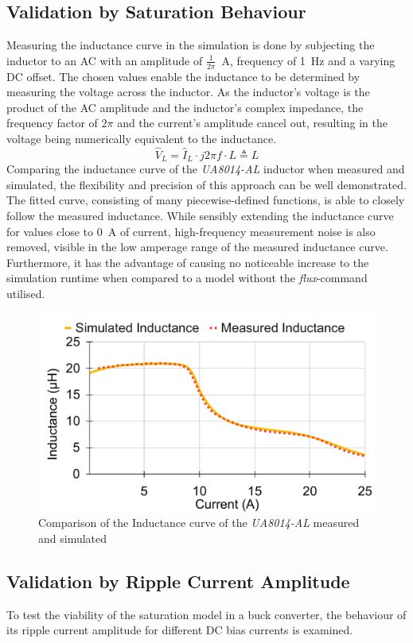 \subsection{Validation by Saturation Behaviour}\label{sec:validation_by_saturation}
Measuring the inductance curve in the simulation is done by subjecting the inductor to an \ac{AC} with an amplitude of $\frac{1}{2\pi}$\SI{ }{\A}, frequency of \SI{1}{\Hz} and a varying \ac{DC} offset. The chosen values enable the inductance to be determined by measuring the voltage across the inductor. As the inductor's voltage is the product of the \ac{AC} amplitude and the inductor's complex impedance, the frequency factor of $2\pi$ and the current's amplitude cancel out, resulting in the voltage being numerically equivalent to the inductance.
\begin{equation}\label{eq:inductance_from_voltage}
    \hat{V}_L = \hat{I}_L \cdot j 2\pi f\cdot L \triangleq L
\end{equation}
Comparing the inductance curve of the \textit{UA8014-AL} inductor when measured and simulated, the flexibility and precision of this approach can be well demonstrated. The fitted curve, consisting of many piecewise-defined functions, is able to closely follow the measured inductance. While sensibly extending the inductance curve for values close to \SI{0}{\A} of current, high-frequency measurement noise is also removed, visible in the low amperage range of the measured inductance curve. Furthermore, it has the advantage of causing no noticeable increase to the simulation runtime when compared to a model without the \textit{flux}-command utilised. 
\begin{figure}[H]
    \centering
    \includegraphics[width=0.7\linewidth]{Bilder/Kapitel3/Saturation_Measured_vs_LTspice.pdf}
    \caption{Comparison of the Inductance curve of the \textit{UA8014-AL} measured and simulated}
    \label{fig:comparison_of_saturation}
\end{figure}
\subsection{Validation by Ripple Current Amplitude}\label{sec:validation_by_ripple_current_amplitude}
To test the viability of the saturation model in a buck converter, the behaviour of its ripple current amplitude for different \ac{DC} bias currents is examined.\\

